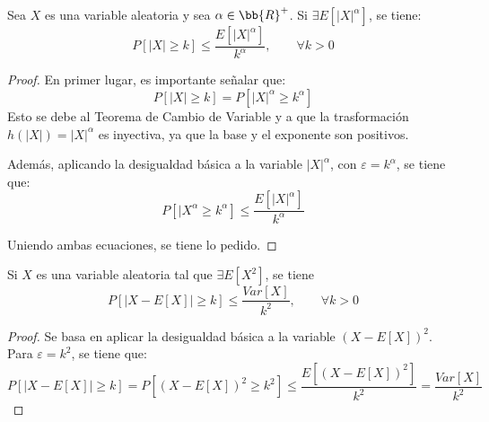 \begin{coro}
    Sea $X$ es una variable aleatoria y sea $\alpha\in \bb{R}^+$. Si $\exists E[|X|^\alpha]$, se tiene:
    \begin{equation*}
        P[|X|\geq k]\leq \frac{E[|X|^\alpha]}{k^\alpha},\qquad \forall k>0
    \end{equation*}
\end{coro}
\begin{proof}
    En primer lugar, es importante señalar que:
    \begin{equation*}
        P[|X|\geq k]=P[|X|^\alpha \geq k^\alpha]
    \end{equation*}
    Esto se debe al Teorema de Cambio de Variable y a que la trasformación $h(|X|)=|X|^\alpha$ es inyectiva, ya que la base y el exponente son positivos.

    Además, aplicando la desigualdad básica a la variable $|X|^\alpha$, con $\varepsilon=k^\alpha$, se tiene que:
    \begin{equation*}
        P[|X^\alpha\geq k^\alpha]\leq \frac{E[|X|^\alpha]}{k^\alpha}
    \end{equation*}

    Uniendo ambas ecuaciones, se tiene lo pedido.
\end{proof}

\begin{coro}
    Si $X$ es una variable aleatoria tal que $\exists E[X^2]$, se tiene
    \begin{equation*}
        P[|X-E[X]|\geq k]\leq \frac{Var[X]}{k^2},\qquad \forall k>0
    \end{equation*}
\end{coro}
\begin{proof}
    Se basa en aplicar la desigualdad básica a la variable $(X-E[X])^2$. Para $\varepsilon=k^2$, se tiene que:
    \begin{equation*}
        P[|X-E[X]|\geq k] = P[(X-E[X])^2\geq k^2] \leq \frac{E[(X-E[X])^2]}{k^2} = \frac{Var[X]}{k^2}
    \end{equation*}
\end{proof}

